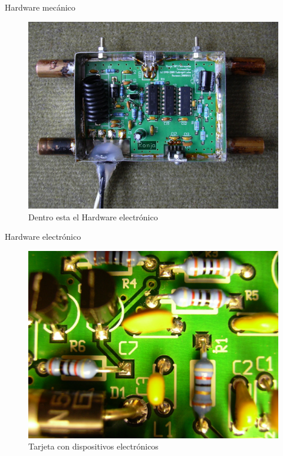 \documentclass{beamer}
\begin{document}
\begin{frame}{Hardware mecánico}
  \begin{figure}
    \includegraphics[scale=0.85]{transmisor/1b76}
    \caption{Dentro esta el Hardware electrónico}
  \end{figure}
\end{frame}

\begin{frame}{Hardware electrónico}
  \begin{figure}
    \includegraphics[scale=0.85]{transmisor/1b84}
    \caption{Tarjeta con dispositivos electrónicos}
  \end{figure}
\end{frame}
\end{document}
